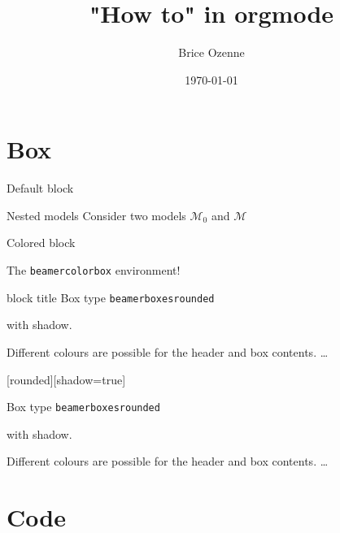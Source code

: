 \documentclass[table]{beamer}
\subtitle{}
\author{Brice Ozenne}
\date{\today}
\title{"How to" in orgmode}
\begin{document}
\maketitle

\section{Box}
\label{sec:org97b7f09}

\begin{frame}[label={sec:org8896cab}]{Default block}
\begin{block}{Nested models}
	Consider two models $ \mathcal{M}_0 $ and $ \mathcal{M} $
\end{block}
\end{frame}

\begin{frame}[label={sec:orgc08f419}]{Colored block}

\begin{block}{}
	The \texttt{beamercolorbox} environment!
\end{block}

\begin{exampleblock}{block title}
	Box type \texttt{beamerboxesrounded}
	
	with shadow.
	
	Different colours are possible for the header and box contents. \ldots
\end{exampleblock}

[rounded][shadow=true]
\begin{example}
	Box type \texttt{beamerboxesrounded}
	
	with shadow.
	
	Different colours are possible for the header and box contents. \ldots
\end{example}
\end{frame}

\section{Code}
\label{sec:orgc46a035}
\end{document}
